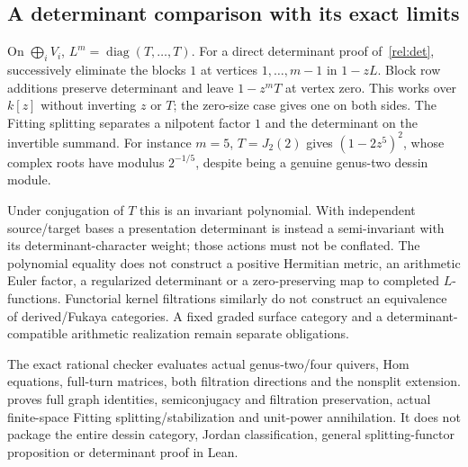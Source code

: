 \subsection{A determinant comparison with its exact limits}
On $\bigoplus_iV_i$, $L^m=\operatorname{diag}(T,\ldots,T)$.
For a direct determinant proof of~\eqref{rel:det}, successively eliminate
the blocks $1$ at vertices $1,\ldots,m-1$ in $1-zL$.
Block row additions preserve determinant and leave $1-z^mT$ at vertex
zero. This works over $k[z]$ without inverting $z$ or $T$; the zero-size
case gives one on both sides. The Fitting splitting separates a nilpotent
factor $1$ and the determinant on the invertible summand. For instance
$m=5$, $T=J_2(2)$ gives $(1-2z^5)^2$, whose complex roots have modulus
$2^{-1/5}$, despite being a genuine genus-two dessin module.

Under conjugation of $T$ this is an invariant polynomial. With independent
source/target bases a presentation determinant is instead a semi-invariant
with its determinant-character weight; those actions must not be conflated.
The polynomial equality does not construct a positive Hermitian metric,
an arithmetic Euler factor, a regularized determinant or a zero-preserving
map to completed $L$-functions. Functorial kernel filtrations similarly do
not construct an equivalence of derived/Fukaya categories. A fixed graded
surface category and a determinant-compatible arithmetic realization remain
separate obligations.

The exact rational checker evaluates actual genus-two/four quivers, Hom
equations, full-turn matrices, both filtration directions and the nonsplit
extension.  proves full graph
identities, semiconjugacy and filtration preservation, actual finite-space
Fitting splitting/stabilization and unit-power annihilation. It does not
package the entire dessin category, Jordan classification, general
splitting-functor proposition or determinant proof in Lean.
